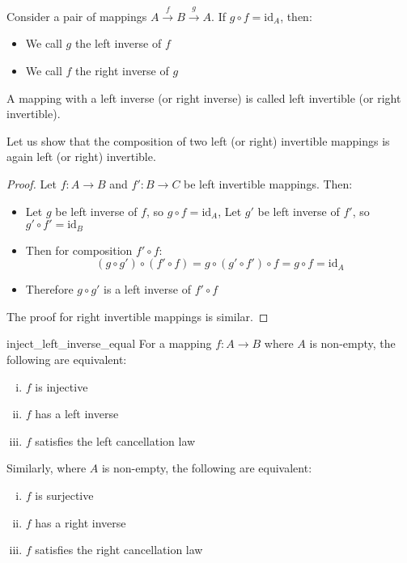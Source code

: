 \documentclass[11pt,lang=en]{elegantbook}
\begin{document}
\begin{definition}
  Consider a pair of mappings $A \xrightarrow{f} B \xrightarrow{g} A$.
  If $g \circ f = \text{id}_A$, then:
  \begin{itemize}
    \item We call $g$ the left inverse of $f$
    \item We call $f$ the right inverse of $g$
  \end{itemize}
  A mapping with a left inverse (or right inverse) is called left invertible (or right invertible).
\end{definition}

\begin{example}
  Let us show that the composition of two left (or right) invertible mappings is again left (or right) invertible.

  \begin{proof}
    Let $f: A \to B$ and $f': B \to C$ be left invertible mappings. Then:
    \begin{itemize}
      \item Let $g$ be left inverse of $f$, so $g \circ f = \text{id}_A$, Let $g'$ be left inverse of $f'$, so $g' \circ f' = \text{id}_B$
      \item Then for composition $f' \circ f$:
        \[
          (g \circ g') \circ (f' \circ f) = g \circ (g' \circ f') \circ f = g \circ f = \text{id}_A
        \]
      \item Therefore $g \circ g'$ is a left inverse of $f' \circ f$
    \end{itemize}
    The proof for right invertible mappings is similar.
  \end{proof}
\end{example}

\begin{proposition}{}{inject_left_inverse_equal}
  For a mapping $f : A \to B$ where $A$ is non-empty, the following are equivalent:
  \begin{enumerate}[(i)]
    \item $f$ is injective
    \item $f$ has a left inverse
    \item $f$ satisfies the left cancellation law
  \end{enumerate}

  Similarly, where $A$ is non-empty, the following are equivalent:
  \begin{enumerate}[(i)']
    \item $f$ is surjective
    \item $f$ has a right inverse
    \item $f$ satisfies the right cancellation law
  \end{enumerate}
\end{proposition}
\end{document}
